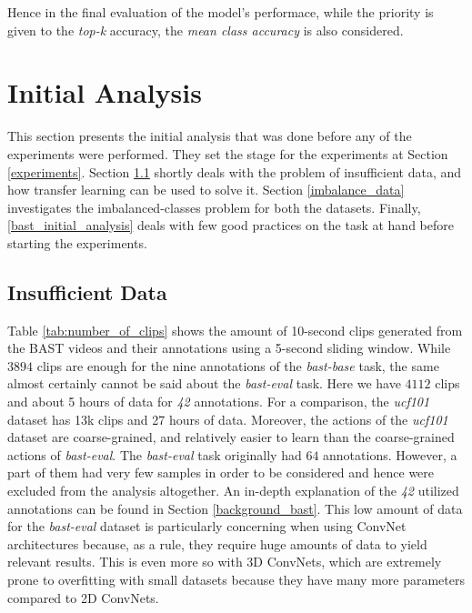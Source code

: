 \documentclass[extern,palatino]{cgMA}
\begin{document}
\noindent Hence in the final evaluation of the model's performace, while the priority is given to the \textit{top-k} accuracy, the \textit{mean class accuracy} is also considered.


\newpage
\section{Initial Analysis}
\label{initial_analysis}
This section presents the initial analysis that was done before any of the experiments were performed. They set the stage for the experiments at Section \ref{experiments}. Section \ref{insufficient_data} shortly deals with the problem of insufficient data, and how transfer learning can be used to solve it. Section \ref{imbalance_data} investigates the imbalanced-classes problem for both the datasets. Finally, \ref{bast_initial_analysis} deals with few good practices on the task at hand before starting the experiments.

\subsection{Insufficient Data}
\label{insufficient_data}
Table \ref{tab:number_of_clips} shows the amount of 10-second clips generated from the BAST videos and their annotations using a 5-second sliding window. While $3894$ clips are enough for the nine annotations of the \textit{bast-base} task, the same almost certainly cannot be said about the \textit{bast-eval} task. Here we have $4112$ clips and about 5 hours of data for \textit{42} annotations. For a comparison, the \textit{ucf101} dataset has 13k clips and 27 hours of data. Moreover, the actions of the \textit{ucf101} dataset are coarse-grained, and relatively easier to learn than the coarse-grained actions of \textit{bast-eval}. The \textit{bast-eval} task originally had $64$ annotations. However, a part of them had very few samples in order to be considered and hence were excluded from the analysis altogether. An in-depth explanation of the \textit{42} utilized annotations can be found in Section \ref{background_bast}. This low amount of data for the \textit{bast-eval} dataset is particularly concerning when using ConvNet architectures because, as a rule, they require huge amounts of data to yield relevant results. This is even more so with 3D ConvNets, which are extremely prone to overfitting with small datasets because they have many more parameters compared to 2D ConvNets.
\end{document}
